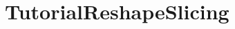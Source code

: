 \hypertarget{group___tutorial_reshape_slicing}{}\section{Tutorial\+Reshape\+Slicing}
\label{group___tutorial_reshape_slicing}
